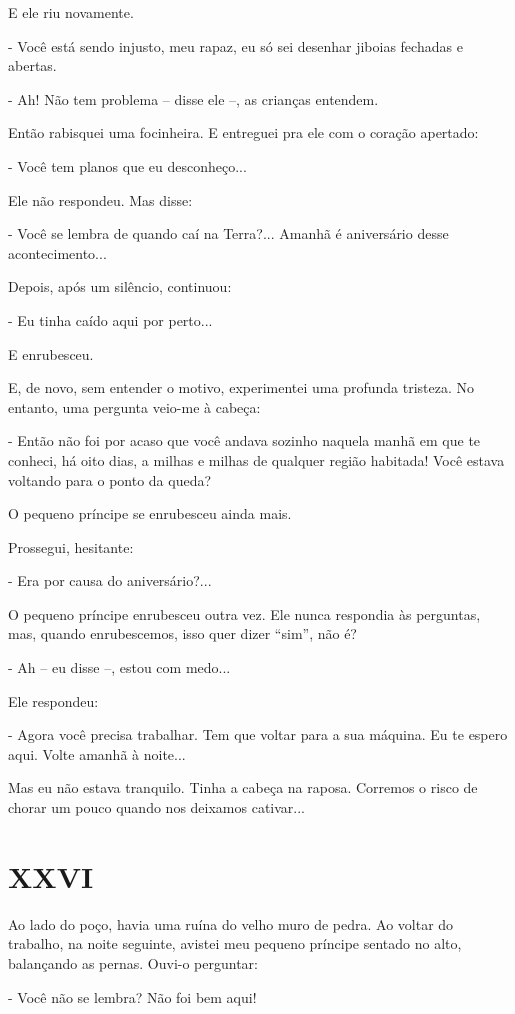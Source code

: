 E ele riu novamente.

- Você está sendo injusto, meu rapaz, eu só sei desenhar jiboias
fechadas e abertas.

- Ah! Não tem problema -- disse ele --, as crianças entendem.

Então rabisquei uma focinheira. E entreguei pra ele com o coração
apertado:

- Você tem planos que eu desconheço...

Ele não respondeu. Mas disse:

- Você se lembra de quando caí na Terra?... Amanhã é aniversário desse
acontecimento...

Depois, após um silêncio, continuou:

- Eu tinha caído aqui por perto...

E enrubesceu.

E, de novo, sem entender o motivo, experimentei uma profunda tristeza.
No entanto, uma pergunta veio-me à cabeça:

- Então não foi por acaso que você andava sozinho naquela manhã em que
te conheci, há oito dias, a milhas e milhas de qualquer região habitada!
Você estava voltando para o ponto da queda?

O pequeno príncipe se enrubesceu ainda mais.

Prossegui, hesitante:

- Era por causa do aniversário?...

O pequeno príncipe enrubesceu outra vez. Ele nunca respondia às
perguntas, mas, quando enrubescemos, isso quer dizer ``sim'', não é?

- Ah -- eu disse --, estou com medo...

Ele respondeu:

- Agora você precisa trabalhar. Tem que voltar para a sua máquina. Eu te
espero aqui. Volte amanhã à noite...

Mas eu não estava tranquilo. Tinha a cabeça na raposa. Corremos o risco
de chorar um pouco quando nos deixamos cativar...

\chapter{XXVI}

Ao lado do poço, havia uma ruína do velho muro de pedra. Ao voltar do
trabalho, na noite seguinte, avistei meu pequeno príncipe sentado no
alto, balançando as pernas. Ouvi-o perguntar:

- Você não se lembra? Não foi bem aqui!

